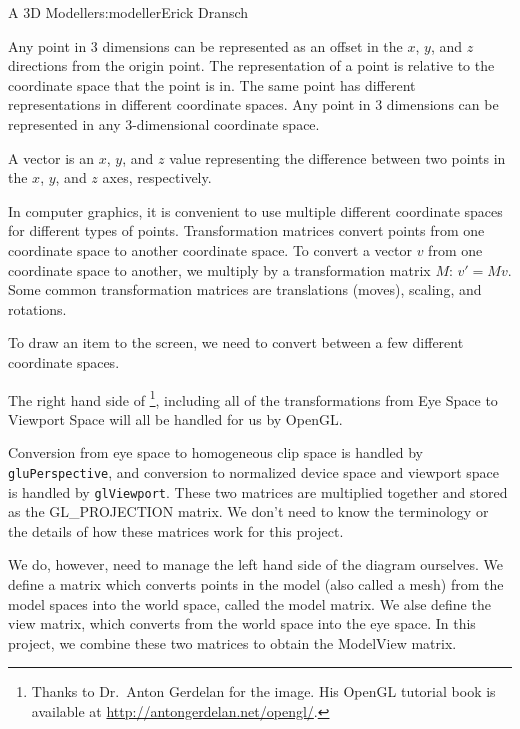 \begin{aosachapter}{A 3D Modeller}{s:modeller}{Erick Dransch}
\label{point}

Any point in 3 dimensions can be represented as an offset in the $x$,
$y$, and $z$ directions from the origin point. The representation of a
point is relative to the coordinate space that the point is in. The same
point has different representations in different coordinate spaces. Any
point in 3 dimensions can be represented in any 3-dimensional coordinate
space.

\label{vector}

A vector is an $x$, $y$, and $z$ value representing the difference
between two points in the $x$, $y$, and $z$ axes, respectively.

\label{transformation-matrix}

In computer graphics, it is convenient to use multiple different
coordinate spaces for different types of points. Transformation matrices
convert points from one coordinate space to another coordinate space. To
convert a vector $v$ from one coordinate space to another, we multiply
by a transformation matrix $M$: $v' = M v$. Some common transformation
matrices are translations (moves), scaling, and rotations.

\label{model-world-view-and-projection-coordinate-spaces}


To draw an item to the screen, we need to convert between a few
different coordinate spaces.

The right hand side of \footnote{Thanks
  to Dr.~Anton Gerdelan for the image. His OpenGL tutorial book is
  available at \url{http://antongerdelan.net/opengl/}.}, including all
of the transformations from Eye Space to Viewport Space will all be
handled for us by OpenGL.

Conversion from eye space to homogeneous clip space is handled by
\texttt{gluPerspective}, and conversion to normalized device space and
viewport space is handled by \texttt{glViewport}. These two matrices are
multiplied together and stored as the GL\_PROJECTION matrix. We don't
need to know the terminology or the details of how these matrices work
for this project.

We do, however, need to manage the left hand side of the diagram
ourselves. We define a matrix which converts points in the model (also
called a mesh) from the model spaces into the world space, called the
model matrix. We alse define the view matrix, which converts from the
world space into the eye space. In this project, we combine these two
matrices to obtain the ModelView matrix.


\end{aosachapter}
